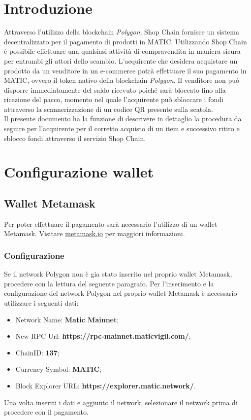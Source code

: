 \documentclass[a4paper, 12pt]{article}
\begin{document}
\makefrontpage
\makeversioni
\tableofcontents
\newpage

\section{Introduzione}
Attraverso l'utilizzo della blockchain \textit{Polygon}, Shop Chain fornisce un sistema decentralizzato per il pagamento di prodotti in MATIC. Utilizzando Shop Chain è possibile effettuare una qualsiasi attività di compravendita in maniera sicura per entrambi gli attori dello scambio. L'acquirente che desidera acquistare un prodotto da un venditore in un e-commerce potrà effettuare il suo pagamento in MATIC, ovvero il token nativo della blockchain \textit{Polygon}. Il venditore non può disporre immediatamente del saldo ricevuto poiché sarà bloccato fino alla ricezione del pacco, momento nel quale l'acquirente può sbloccare i fondi attraverso la scannerizzazione di un codice QR presente sulla scatola.\\
Il presente documento ha la funzione di descrivere in dettaglio la procedura da seguire per l'acquirente per il corretto acquisto di un item e successivo ritiro e sblocco fondi attraverso il servizio Shop Chain.

\section{Configurazione wallet}
\subsection{Wallet Metamask}
Per poter effettuare il pagamento sarà necessario l'utilizzo di un wallet Metamask. Visitare \href{https://www.metamask.io}{metamask.io} per maggiori informazioni.
\subsubsection{Configurazione}
\label{sec:network}
Se il network Polygon non è gia stato inserito nel proprio wallet Metamask, procedere con la lettura del seguente paragrafo.
Per l'inserimento e la configurazione del network Polygon nel proprio wallet Metamask è necessario utilizzare i seguenti dati:
\begin{itemize}
\item Network Name: \textbf{Matic Mainnet};
\item New RPC Url: \textbf{https://rpc-mainnet.maticvigil.com/};
\item ChainID: \textbf{137};
\item Currency Symbol: \textbf{MATIC};
\item Block Explorer URL: \textbf{https://explorer.matic.network/}.
\end{itemize}
Una volta inseriti i dati e aggiunto il network, selezionare il network prima di procedere con il pagamento.
\end{document}
